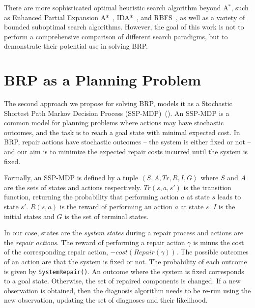 \documentclass[review]{elsarticle}
\newcommand\sysrep[1]{{\tt SystemRepair(#1)}}
\newcommand{\astar}{A$^*$}
\begin{document}



There are more sophisticated optimal heuristic search algorithm beyond \astar{}, such as Enhanced Partial Expansion A*~\cite{goldenberg2014enanced}, IDA*~\cite{korf1985depth}, and RBFS~\cite{korf1993linear}, as well as a variety of bounded suboptimal search algorithms. However, the goal of this work is not to perform a comprehensive comparison of different search paradigms, but to demonstrate their potential use in solving BRP.

\section{BRP as a Planning Problem}
The second approach we propose for solving BRP, models it as a Stochastic Shortest Path Markov Decision Process (SSP-MDP)~(\cite{bertsekas1995dynamic}). An SSP-MDP is a common model for planning problems where actions may have stochastic outcomes, and the task is to reach a goal state with minimal expected cost. 
In BRP, repair actions have stochastic outcomes -- the system is either fixed or not -- and our aim is to minimize the expected repair costs incurred until the system is fixed. 

Formally, an SSP-MDP is defined by a tuple $\left \langle S, A,Tr,R,I,G \right \rangle$ where $S$ and $A$ are the sets of states and actions respectively. $Tr(s,a,{s}')$ is the transition function, returning the probability that performing action $a$ at state $s$ leads to state ${s}'$. $R(s,a)$ is the reward of performing an action $a$ at state $s$. $I$ is the initial states and $G$ is the set of terminal states.

In our case, states are the \emph{system states} during a repair process and actions are the \emph{repair actions}. The reward of performing a repair action $\gamma$ is minus the cost of the corresponding repair action, $-cost(Repair(\gamma))$. The possible outcomes of an action are that the system is fixed or not. The probability of each outcome is given by \sysrep{}. An outcome where the system is fixed corresponds to a goal state. Otherwise, the set of repaired components is changed. If a new observation is obtained, then the diagnosis algorithm needs to be re-run using the new observation, updating the set of diagnoses and their likelihood. %
\end{document}
